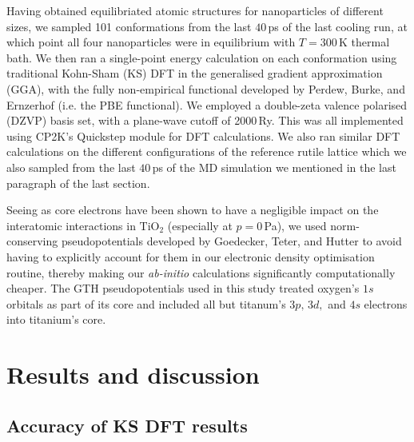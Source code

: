 \documentclass[aps,prb,twocolumn,amsmath,amssymb,superscriptaddress,longbibliography]{revtex4-1}
\newcommand\tab[1][1cm]{\hspace*{#1}} %
\begin{document}
\tab Having obtained equilibriated atomic structures for nanoparticles of different sizes, we sampled 101 conformations from the last $40\,$ps of the last cooling run, at which point all four nanoparticles were in equilibrium with $T = 300\,\text{K}$ thermal bath.
We then ran a single-point energy calculation on each conformation using traditional Kohn-Sham (KS) DFT in the generalised gradient approximation (GGA), with the fully non-empirical functional developed by Perdew, Burke, and Ernzerhof\cite{pbe} (i.e. the PBE functional).
We employed a double-zeta valence polarised (DZVP) basis set, with a plane-wave cutoff of 2000$\,$Ry. 
This was all implemented using \textsc{CP2K}'s Quickstep module for DFT calculations\cite{quickstep}.
We also ran similar DFT calculations on the different configurations of the reference rutile lattice which we also sampled from the last $40\,$ps of the MD simulation we mentioned in the last paragraph of the last section.

\tab Seeing as core electrons have been shown to have a negligible impact on the interatomic interactions in $\text{TiO}_2$\cite{comp_exptl3,electronic_structure} (especially at $p=0\,$Pa), we used norm-conserving pseudopotentials developed by Goedecker, Teter, and Hutter\cite{gth} to avoid having to explicitly account for them in our electronic density optimisation routine, thereby making our \textit{ab-initio} calculations significantly computationally cheaper.
The GTH pseudopotentials used in this study treated oxygen's $1s$ orbitals as part of its core and included all but titanum's $3p,\,3d,$ and $4s$ electrons into titanium's core.


\section{Results and discussion}

\subsection{Accuracy of KS DFT results}
\end{document}
